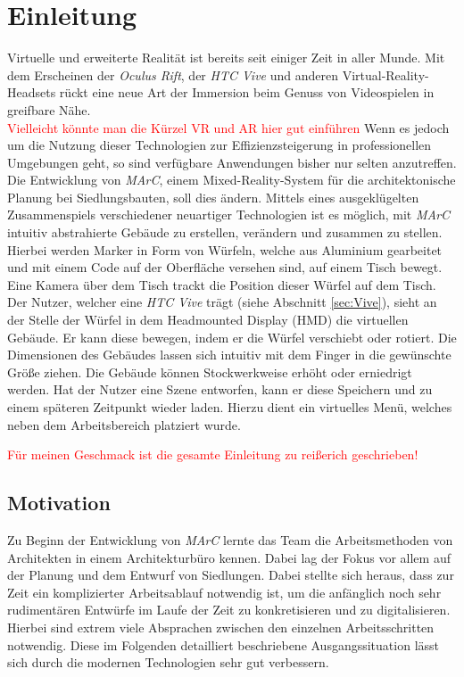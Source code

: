 \section{Einleitung}\label{sec:Einleitung}
Virtuelle und erweiterte Realität ist bereits seit einiger Zeit in aller Munde. Mit dem Erscheinen der \textit{Oculus Rift}, der \textit{HTC Vive} und anderen Virtual-Reality-Headsets rückt eine neue Art der Immersion beim Genuss von Videospielen in greifbare Nähe.\\ \textcolor{red}{Vielleicht könnte man die Kürzel VR und AR hier gut einführen}
Wenn es jedoch um die Nutzung dieser Technologien zur Effizienzsteigerung in professionellen Umgebungen geht, so sind verfügbare Anwendungen bisher nur selten anzutreffen.\\
Die Entwicklung von \textit{MArC}, einem Mixed-Reality-System für die architektonische Planung bei Siedlungsbauten, soll dies ändern. Mittels eines ausgeklügelten Zusammenspiels verschiedener neuartiger Technologien ist es möglich, mit \textit{MArC} intuitiv abstrahierte Gebäude zu erstellen, verändern und zusammen zu stellen. \\
Hierbei werden Marker in Form von Würfeln, welche aus Aluminium gearbeitet und mit einem Code auf der Oberfläche versehen sind, auf einem Tisch bewegt. Eine Kamera über dem Tisch trackt die Position dieser Würfel auf dem Tisch. Der Nutzer, welcher eine \textit{HTC Vive} trägt (siehe Abschnitt \ref{sec:Vive}), sieht an der Stelle der Würfel in dem Headmounted Display (HMD) die virtuellen Gebäude. Er kann diese bewegen, indem er die Würfel verschiebt oder rotiert. Die Dimensionen des Gebäudes lassen sich intuitiv mit dem Finger in die gewünschte Größe ziehen. Die Gebäude können Stockwerkweise erhöht oder erniedrigt werden. Hat der Nutzer eine Szene entworfen, kann er diese Speichern und zu einem späteren Zeitpunkt wieder laden. Hierzu dient ein virtuelles Menü, welches neben dem Arbeitsbereich platziert wurde.

\textcolor{red}{Für meinen Geschmack ist die gesamte Einleitung zu reißerich geschrieben!}

\subsection{Motivation}\label{sec:Motivation}
Zu Beginn der Entwicklung von \textit{MArC} lernte das Team die Arbeitsmethoden von Architekten in einem Architekturbüro kennen. Dabei lag der Fokus vor allem auf der Planung und dem Entwurf von Siedlungen. Dabei stellte sich heraus, dass zur Zeit ein komplizierter Arbeitsablauf notwendig ist, um die anfänglich noch sehr rudimentären Entwürfe im Laufe der Zeit zu konkretisieren und zu digitalisieren. Hierbei sind extrem viele Absprachen zwischen den einzelnen Arbeitsschritten notwendig. Diese im Folgenden detailliert beschriebene Ausgangssituation lässt sich durch die modernen Technologien sehr gut verbessern.



